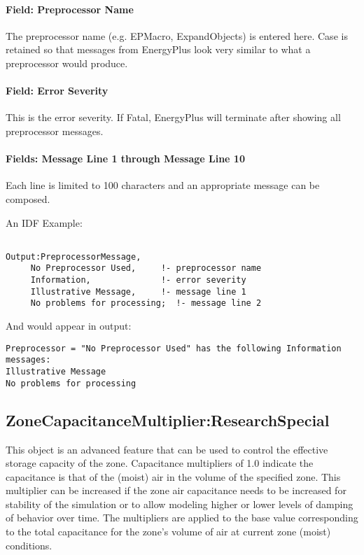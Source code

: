 \paragraph{Field: Preprocessor Name}\label{field-preprocessor-name}

The preprocessor name (e.g. EPMacro, ExpandObjects) is entered here. Case is retained so that messages from EnergyPlus look very similar to what a preprocessor would produce.

\paragraph{Field: Error Severity}\label{field-error-severity}

This is the error severity. If Fatal, EnergyPlus will terminate after showing all preprocessor messages.

\paragraph{Fields: Message Line 1 through Message Line 10}\label{fields-message-line-1-through-message-line-10}

Each line is limited to 100 characters and an appropriate message can be composed.

An IDF Example:

\begin{lstlisting}

Output:PreprocessorMessage,
     No Preprocessor Used,     !- preprocessor name
     Information,              !- error severity
     Illustrative Message,     !- message line 1
     No problems for processing;  !- message line 2
\end{lstlisting}

And would appear in output:

\begin{lstlisting}
Preprocessor = "No Preprocessor Used" has the following Information messages:
Illustrative Message
No problems for processing
\end{lstlisting}

\subsection{ZoneCapacitanceMultiplier:ResearchSpecial}\label{zonecapacitancemultiplierresearchspecial}

This object is an advanced feature that can be used to control the effective storage capacity of the zone. Capacitance multipliers of 1.0 indicate the capacitance is that of the (moist) air in the volume of the specified zone. This multiplier can be increased if the zone air capacitance needs to be increased for stability of the simulation or to allow modeling higher or lower levels of damping of behavior over time. The multipliers are applied to the base value corresponding to the total capacitance for the zone's volume of air at current zone (moist) conditions.

